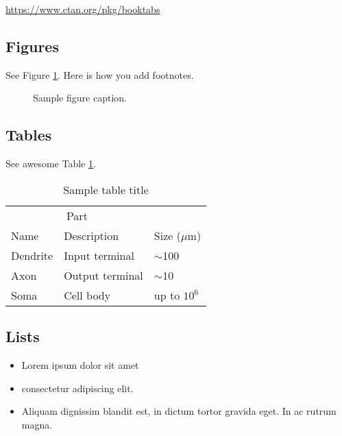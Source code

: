 \documentclass[twocolumn]{article}
\begin{document}
\begin{center}
  \url{https://www.ctan.org/pkg/booktabs}
\end{center}


\subsection{Figures}
\lipsum[10] 
See Figure \ref{fig:fig1}. Here is how you add footnotes. %
\lipsum[11] 

\begin{figure}
  \centering
  \fbox{\rule[-.5cm]{4cm}{4cm} \rule[-.5cm]{4cm}{0cm}}
  \caption{Sample figure caption.}
  \label{fig:fig1}
\end{figure}

\subsection{Tables}
\lipsum[12]
See awesome Table \ref{tab:table}.

\begin{table}[H]
 \caption{Sample table title}
  \centering
  \begin{tabular}{lll}
    \toprule
    \multicolumn{2}{c}{Part}                   \\
    \cmidrule(r){1-2}
    Name     & Description     & Size ($\mu$m) \\
    \midrule
    Dendrite & Input terminal  & $\sim$100     \\
    Axon     & Output terminal & $\sim$10      \\
    Soma     & Cell body       & up to $10^6$  \\
    \bottomrule
  \end{tabular}
  \label{tab:table}
\end{table}

\subsection{Lists}
\begin{itemize}
\item Lorem ipsum dolor sit amet
\item consectetur adipiscing elit. 
\item Aliquam dignissim blandit est, in dictum tortor gravida eget. In ac rutrum magna.
\end{itemize}

\end{document}
